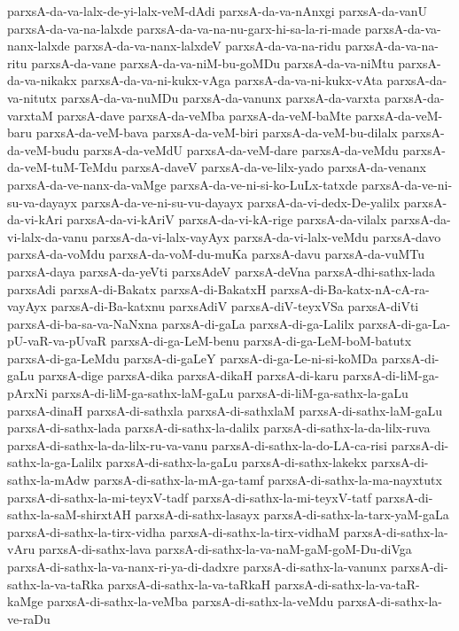 {parxsA-da-va-lalx-de-yi-lalx-veM-dAdi
parxsA-da-va-nAnxgi
parxsA-da-vanU
parxsA-da-va-na-lalxde
parxsA-da-va-na-nu-garx-hi-sa-la-ri-made
parxsA-da-va-nanx-lalxde
parxsA-da-va-nanx-lalxdeV
parxsA-da-va-na-ridu
parxsA-da-va-na-ritu
parxsA-da-vane
parxsA-da-va-niM-bu-goMDu
parxsA-da-va-niMtu
parxsA-da-va-nikakx
parxsA-da-va-ni-kukx-vAga
parxsA-da-va-ni-kukx-vAta
parxsA-da-va-nitutx
parxsA-da-va-nuMDu
parxsA-da-vanunx
parxsA-da-varxta
parxsA-da-varxtaM
parxsA-dave
parxsA-da-veMba
parxsA-da-veM-baMte
parxsA-da-veM-baru
parxsA-da-veM-bava
parxsA-da-veM-biri
parxsA-da-veM-bu-dilalx
parxsA-da-veM-budu
parxsA-da-veMdU
parxsA-da-veM-dare
parxsA-da-veMdu
parxsA-da-veM-tuM-TeMdu
parxsA-daveV
parxsA-da-ve-lilx-yado
parxsA-da-venanx
parxsA-da-ve-nanx-da-vaMge
parxsA-da-ve-ni-si-ko-LuLx-tatxde
parxsA-da-ve-ni-su-va-dayayx
parxsA-da-ve-ni-su-vu-dayayx
parxsA-da-vi-dedx-De-yalilx
parxsA-da-vi-kAri
parxsA-da-vi-kAriV
parxsA-da-vi-kA-rige
parxsA-da-vilalx
parxsA-da-vi-lalx-da-vanu
parxsA-da-vi-lalx-vayAyx
parxsA-da-vi-lalx-veMdu
parxsA-davo
parxsA-da-voMdu
parxsA-da-voM-du-muKa
parxsA-davu
parxsA-da-vuMTu
parxsA-daya
parxsA-da-yeVti
parxsAdeV
parxsA-deVna
parxsA-dhi-sathx-lada
parxsAdi
parxsA-di-Bakatx
parxsA-di-BakatxH
parxsA-di-Ba-katx-nA-cA-ra-vayAyx
parxsA-di-Ba-katxnu
parxsAdiV
parxsA-diV-teyxVSa
parxsA-diVti
parxsA-di-ba-sa-va-NaNxna
parxsA-di-gaLa
parxsA-di-ga-Lalilx
parxsA-di-ga-La-pU-vaR-va-pUvaR
parxsA-di-ga-LeM-benu
parxsA-di-ga-LeM-boM-batutx
parxsA-di-ga-LeMdu
parxsA-di-gaLeY
parxsA-di-ga-Le-ni-si-koMDa
parxsA-di-gaLu
parxsA-dige
parxsA-dika
parxsA-dikaH
parxsA-di-karu
parxsA-di-liM-ga-pArxNi
parxsA-di-liM-ga-sathx-laM-gaLu
parxsA-di-liM-ga-sathx-la-gaLu
parxsA-dinaH
parxsA-di-sathxla
parxsA-di-sathxlaM
parxsA-di-sathx-laM-gaLu
parxsA-di-sathx-lada
parxsA-di-sathx-la-dalilx
parxsA-di-sathx-la-da-lilx-ruva
parxsA-di-sathx-la-da-lilx-ru-va-vanu
parxsA-di-sathx-la-do-LA-ca-risi
parxsA-di-sathx-la-ga-Lalilx
parxsA-di-sathx-la-gaLu
parxsA-di-sathx-lakekx
parxsA-di-sathx-la-mAdw
parxsA-di-sathx-la-mA-ga-tamf
parxsA-di-sathx-la-ma-nayxtutx
parxsA-di-sathx-la-mi-teyxV-tadf
parxsA-di-sathx-la-mi-teyxV-tatf
parxsA-di-sathx-la-saM-shirxtAH
parxsA-di-sathx-lasayx
parxsA-di-sathx-la-tarx-yaM-gaLa
parxsA-di-sathx-la-tirx-vidha
parxsA-di-sathx-la-tirx-vidhaM
parxsA-di-sathx-la-vAru
parxsA-di-sathx-lava
parxsA-di-sathx-la-va-naM-gaM-goM-Du-diVga
parxsA-di-sathx-la-va-nanx-ri-ya-di-dadxre
parxsA-di-sathx-la-vanunx
parxsA-di-sathx-la-va-taRka
parxsA-di-sathx-la-va-taRkaH
parxsA-di-sathx-la-va-taR-kaMge
parxsA-di-sathx-la-veMba
parxsA-di-sathx-la-veMdu
parxsA-di-sathx-la-ve-raDu
}
